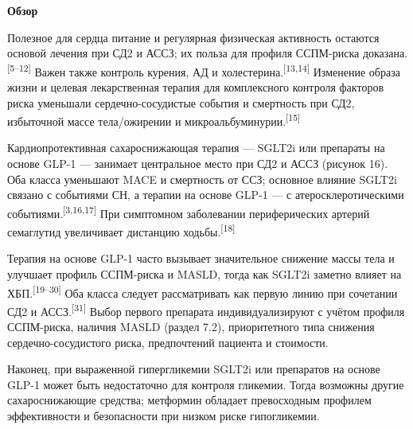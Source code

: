 \documentclass[11pt,a4paper]{article}
\newcommand{\src}[1]{\textsuperscript{[#1]}}
\newcommand{\heading}[1]{\par\medskip\textbf{#1}\par}
\begin{document}
\heading{Обзор}
Полезное для сердца питание и регулярная физическая активность остаются основой лечения при СД2 и АССЗ; их польза для профиля ССПМ-риска доказана.\src{5--12} Важен также контроль курения, АД и холестерина.\src{13,14} Изменение образа жизни и целевая лекарственная терапия для комплексного контроля факторов риска уменьшали сердечно-сосудистые события и смертность при СД2, избыточной массе тела/ожирении и микроальбуминурии.\src{15}

Кардиопротективная сахароснижающая терапия --- SGLT2i или препараты на основе GLP-1 --- занимает центральное место при СД2 и АССЗ (рисунок 16). Оба класса уменьшают MACE и смертность от ССЗ; основное влияние SGLT2i связано с событиями СН, а терапии на основе GLP-1 --- с атеросклеротическими событиями.\src{3,16,17} При симптомном заболевании периферических артерий семаглутид увеличивает дистанцию ходьбы.\src{18}

Терапия на основе GLP-1 часто вызывает значительное снижение массы тела и улучшает профиль ССПМ-риска и MASLD, тогда как SGLT2i заметно влияет на ХБП.\src{19--30} Оба класса следует рассматривать как первую линию при сочетании СД2 и АССЗ.\src{31} Выбор первого препарата индивидуализируют с учётом профиля ССПМ-риска, наличия MASLD (раздел 7.2), приоритетного типа снижения сердечно-сосудистого риска, предпочтений пациента и стоимости.

Наконец, при выраженной гипергликемии SGLT2i или препаратов на основе GLP-1 может быть недостаточно для контроля гликемии. Тогда возможны другие сахароснижающие средства; метформин обладает превосходным профилем эффективности и безопасности при низком риске гипогликемии.
\end{document}
